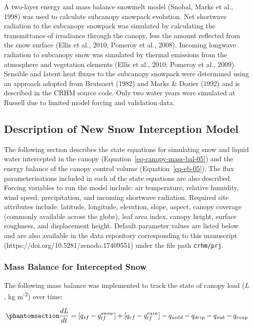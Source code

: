 \documentclass[
  letterpaper,
]{tex/uofsthesis-cs}
\begin{document}
A two-layer energy and mass balance snowmelt model (Snobal, Marks et
al., 1998) was used to calculate subcanopy snowpack evolution. Net
shortwave radiation to the subcanopy snowpack was simulated by
calculating the transmittance of irradiance through the canopy, less the
amount reflected from the snow surface (Ellis et al., 2010; Pomeroy et
al., 2008). Incoming longwave radiation to subcanopy snow was simulated
by thermal emissions from the atmosphere and vegetation elements (Ellis
et al., 2010; Pomeroy et al., 2009). Sensible and latent heat fluxes to
the subcanopy snowpack were determined using an approach adopted from
Brutsaert (1982) and Marks \& Dozier (1992) and is described in the CRHM
source code. Only two water years were simulated at Russell due to
limited model forcing and validation data.

\subsection{Description of New Snow Interception
Model}\label{sec-cp25-desc}

The following section describes the state equations for simulating snow
and liquid water intercepted in the canopy
(Equation~\ref{eq-canopy-mass-bal-05}) and the energy balance of the
canopy control volume (Equation~\ref{eq-eb-05}). The flux
parameterisations included in each of the state equations are also
described. Forcing variables to run the model include: air temperature,
relative humidity, wind speed, precipitation, and incoming shortwave
radiation. Required site attributes include: latitude, longitude,
elevation, slope, aspect, canopy coverage (commonly available across the
globe), leaf area index, canopy height, surface roughness, and
displacement height. Default parameter values are listed below and are
also available in the data repository corresponding to this manuscript
(https://doi.org/10.5281/zenodo.17409551) under the file path
\texttt{crhm/prj}.

\subsubsection{Mass Balance for Intercepted
Snow}\label{mass-balance-for-intercepted-snow}

The following mass balance was implemented to track the state of canopy
load (\(L\), kg m\textsuperscript{-2}) over time:

\begin{equation}\phantomsection\label{eq-canopy-mass-bal-05}{
\frac{dL}{dt} = 
[q_{sf} - q_{tf}^{snow}] + [q_{rf} - q_{tf}^{rain}] - q_{unld} - q_{drip} - q_{sub} - q_{evap}
}\end{equation}
\end{document}
